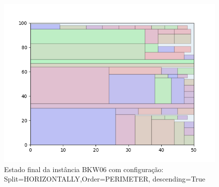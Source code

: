 \begin{figure}[H]
    \centering
    \caption[]{Estado final da instância BKW06 com configuração: Split=HORIZONTALLY,Order=PERIMETER, descending=True}
    \label{fig:bkw06-horizontally-perimeter-true}
    \includegraphics[scale=0.5]{output/figures/bkw/bkw06/horizontally/perimeter/true/00}
\end{figure}
